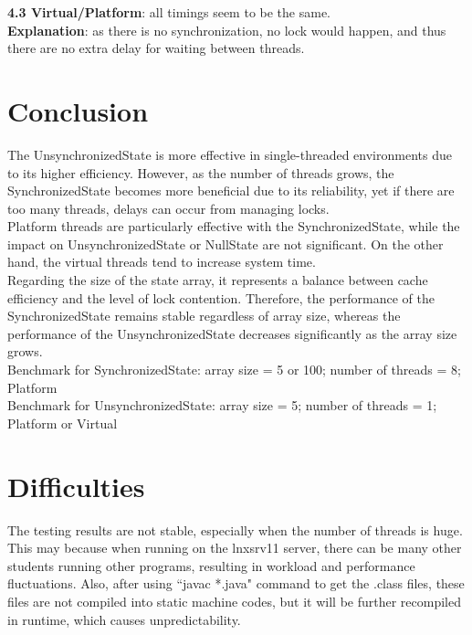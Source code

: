 \documentclass[letterpaper,twocolumn,10pt]{article}
\begin{document}
\noindent\textbf{4.3 Virtual/Platform}: all timings seem to be the same.\\
\textbf{Explanation}: as there is no synchronization, no lock would
happen, and thus there are no extra delay for waiting between threads.

\section{Conclusion}

\noindent The UnsynchronizedState is more effective in single-threaded
environments due to its higher efficiency. However, as the
number of threads grows, the SynchronizedState becomes
more beneficial due to its reliability, yet if there are too many
threads, delays can occur from managing locks.\\

\noindent Platform threads are particularly effective with the
SynchronizedState, while the impact on UnsynchronizedState
or NullState are not significant. On the other hand, the virtual
threads tend to increase system time.\\

\noindent Regarding the size of the state array, it represents
a balance between cache efficiency and the level of lock
contention. Therefore, the performance of the
SynchronizedState remains stable regardless of array size,
whereas the performance of the UnsynchronizedState
decreases significantly as the array size grows.\\

\noindent Benchmark for SynchronizedState: array size = 5 or 100;
number of threads = 8; Platform\\

\noindent Benchmark for UnsynchronizedState: array size = 5;
number of threads = 1; Platform or Virtual\\

\section{Difficulties}

The testing results are not stable, especially when the number
of threads is huge. This may because when running on the
lnxsrv11 server, there can be many other students running other
programs, resulting in workload and performance fluctuations.
Also, after using ``javac *.java" command to get the .class files,
these files are not compiled into static machine codes, but it will
be further recompiled in runtime, which causes unpredictability.\\
\end{document}
